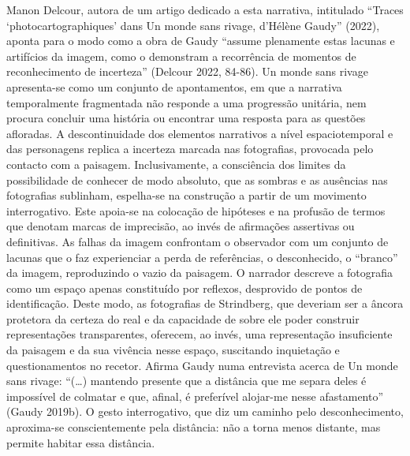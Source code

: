 \documentclass{article}
\begin{document}
Manon Delcour, autora de um artigo dedicado a esta narrativa, intitulado “Traces
‘photocartographiques’ dans Un monde sans rivage, d’Hélène Gaudy” (2022), aponta
para o modo como a obra de Gaudy “assume plenamente estas lacunas e artifícios da
imagem, como o demonstram a recorrência de momentos de reconhecimento de incerteza” (Delcour 2022, 84-86). Un monde sans rivage apresenta-se como um conjunto de apontamentos, em que a narrativa temporalmente fragmentada não responde a uma progressão unitária, nem procura concluir uma história ou encontrar
uma resposta para as questões afloradas. A descontinuidade dos elementos narrativos a nível espaciotemporal e das personagens replica a incerteza marcada nas fotografias, provocada pelo contacto com a paisagem. Inclusivamente, a consciência dos
limites da possibilidade de conhecer de modo absoluto, que as sombras e as ausências
nas fotografias sublinham, espelha-se na construção a partir de um movimento interrogativo. Este apoia-se na colocação de hipóteses e na profusão de termos que denotam marcas de imprecisão, ao invés de afirmações assertivas ou definitivas. As
falhas da imagem confrontam o observador com um conjunto de lacunas que o faz
experienciar a perda de referências, o desconhecido, o “branco” da imagem, reproduzindo o vazio da paisagem. O narrador descreve a fotografia como um espaço apenas
constituído por reflexos, desprovido de pontos de identificação. Deste modo, as fotografias de Strindberg, que deveriam ser a âncora protetora da certeza do real e da
capacidade de sobre ele poder construir representações transparentes, oferecem, ao
invés, uma representação insuficiente da paisagem e da sua vivência nesse espaço,
suscitando inquietação e questionamentos no recetor. Afirma Gaudy numa entrevista acerca de Un monde sans rivage: “(…) mantendo presente que a distância que
me separa deles é impossível de colmatar e que, afinal, é preferível alojar-me nesse
afastamento” (Gaudy 2019b). O gesto interrogativo, que diz um caminho pelo desconhecimento, aproxima-se conscientemente pela distância: não a torna menos distante, mas permite habitar essa distância.
\end{document}
